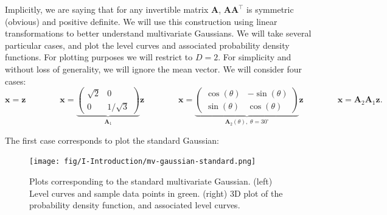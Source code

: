 \vspace{2mm}


Implicitly, we are saying that for any invertible matrix $\mathbf{A}$, $\mathbf{A}\mathbf{A}^\top$ is symmetric (obvious) and positive definite. We will use this construction using linear transformations to better understand multivariate Gaussians. We will take several particular cases, and plot the level curves and associated probability density functions. For plotting purposes we will restrict to $D=2$. For simplicity and without loss of generality, we will ignore the mean vector. We will consider four cases:
\begin{equation}
\mathbf{x} = \mathbf{z} \qquad\qquad \mathbf{x} = \underbrace{\left(\begin{array}{cc}\sqrt{2} & 0\\0 & 1/\sqrt{3}\end{array}\right)}_{\mathbf{A}_1}\mathbf{z} \qquad\qquad \mathbf{x} = \underbrace{\left(\begin{array}{cc}\cos(\theta) & -\sin(\theta)\\\sin(\theta) & \cos(\theta)\end{array}\right)}_{\mathbf{A}_2(\theta),\; \theta=30^\circ}\mathbf{z} \qquad\qquad \mathbf{x} = \mathbf{A}_2\mathbf{A}_1\mathbf{z}.
\end{equation}

The first case corresponds to plot the standard Gaussian:
\begin{figure}[H]
 \centering
 \texttt{[image: fig/I-Introduction/mv-gaussian-standard.png]}
 \caption{Plots corresponding to the standard multivariate Gaussian. (left) Level curves and sample data points in green. (right) 3D plot of the probability density function, and associated level curves.}
\end{figure}

